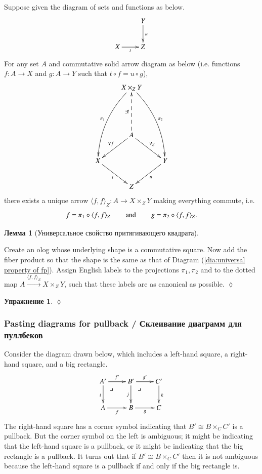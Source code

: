 \documentclass[a4paper]{book}
\makeatletter
\def\hsp{\hspace{.3in}}
\def\to{\rightarrow}
\def\taking{\colon}
\def\iso{\cong}
\def\la{\langle}
\def\ra{\rangle}
\def\ullimit{\ar@{}[rd]|(.3)*+{\lrcorner}}
\newcommand{\To}[1]{\xrightarrow{#1}}
\newcommand{\prodmap}[2]{\la#1,#2\ra}
\newcommand{\pb}[3]{\prodmap{#1}{#1}_{#3}}
\theoremstyle{myth}
\newtheorem{lemmaENG}[envENG]{\begin{english}Lemma\end{english}}
\newtheorem{excENG}[envENG]{\begin{english}Exercise\end{english}}
\newenvironment{exerciseENG}{\begin{excENG}}{\hspace*{\fill}$\lozenge$\end{excENG}}
\newtheorem{lemmaRUS}[envRUS]{Лемма}
\newtheorem{excRUS}[envRUS]{Упражнение}
\newenvironment{exerciseRUS}{\begin{excRUS}}{\hspace*{\fill}$\lozenge$\end{excRUS}}
\makeatother
\begin{document}
\begin{russian}
\begin{lemmaENG}\label{lemma:up for fp}
Suppose given the diagram of sets and functions as below.
\begin{align*}
\xymatrix{&Y\ar[d]^u\\
X\ar[r]_t&Z}
\end{align*}
For any set $A$ and commutative solid arrow diagram as below (i.e. functions $f\taking A\to X$ and $g\taking A\to Y$ such that $t\circ f=u\circ g$), 
\begin{align}\label{dia:universal property of fp}
\xymatrix{
&X\times_ZY\ar@/_1pc/[lddd]_{\pi_1}\ar@/^1pc/[rddd]^{\pi_2}\\\\
&A\ar@{-->}[uu]^{\exists!}\ar[dl]_{\forall f}\ar[dr]^{\forall g}&\\
X\ar[rd]_t&&Y\ar[ld]^u\\
&Z&}
\end{align}
there exists a unique arrow $\pb{f}{g}{Z}\taking A\to X\times_ZY$ making everything commute, i.e. 
$$f=\pi_1\circ \pb{f}{g}{Z}\hsp\text{and}\hsp g=\pi_2\circ\pb{f}{g}{Z}.$$
\end{lemmaENG}

\begin{lemmaRUS}[Универсальное свойство притягивающего квадрата]\label{lemma:up for fp}
 
\end{lemmaRUS}

\begin{exerciseENG}
Create an olog whose underlying shape is a commutative square. Now add the fiber product so that the shape is the same as that of Diagram (\ref{dia:universal property of fp}). Assign English labels to the projections $\pi_1,\pi_2$ and to the dotted map $A\To{\pb{f}{g}{Z}}X\times_ZY$, such that these labels are as canonical as possible.
\end{exerciseENG}

\begin{exerciseRUS}
 
\end{exerciseRUS}


\subsubsection{Pasting diagrams for pullback / Склеивание диаграмм для пуллбеков}

Consider the diagram drawn below, which includes a left-hand square, a right-hand square, and a big rectangle.
$$
\xymatrix{
A'\ar[r]^{f'}\ar[d]_i\ullimit&B'\ar[r]^{g'}\ar[d]_j\ullimit&C'\ar[d]^k\\
A\ar[r]_f&B\ar[r]_g&C}
$$
The right-hand square has a corner symbol indicating that $B'\iso B\times_CC'$ is a pullback. But the corner symbol on the left is ambiguous; it might be indicating that the left-hand square is a pullback, or it might be indicating that the big rectangle is a pullback. It turns out that if $B'\iso B\times_CC'$ then it is not ambiguous because the left-hand square is a pullback if and only if the big rectangle is.


\end{russian}
\end{document}
